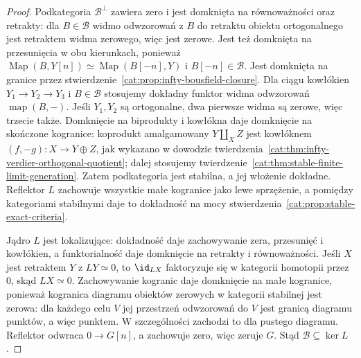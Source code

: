 \begin{proof}
Podkategoria $\mathcal B^\perp$ zawiera zero i jest domknięta na równoważności oraz retrakty: dla $B\in\mathcal B$ widmo odwzorowań z $B$ do retraktu obiektu ortogonalnego jest retraktem widma zerowego, więc jest zerowe. Jest też domknięta na przesunięcia w obu kierunkach, ponieważ $\operatorname{Map}(B,Y[n])\simeq\operatorname{Map}(B[-n],Y)$ i $B[-n]\in\mathcal B$. Jest domknięta na granice przez stwierdzenie~\ref{cat:prop:infty-bousfield-closure}. Dla ciągu kowłókien $Y_1\to Y_2\to Y_3$ i $B\in\mathcal B$ stosujemy dokładny funktor widma odwzorowań $\operatorname{map}(B,-)$. Jeśli $Y_1,Y_2$ są ortogonalne, dwa pierwsze widma są zerowe, więc trzecie także. Domknięcie na biprodukty i kowłókna daje domknięcie na skończone kogranice: koprodukt amalgamowany $Y\amalg_X Z$ jest kowłóknem $(f,-g):X\to Y\oplus Z$, jak wykazano w dowodzie twierdzenia~\ref{cat:thm:infty-verdier-orthogonal-quotient}; dalej stosujemy twierdzenie~\ref{cat:thm:stable-finite-limit-generation}. Zatem podkategoria jest stabilna, a jej włożenie dokładne. Reflektor $L$ zachowuje wszystkie małe kogranice jako lewe sprzężenie, a pomiędzy kategoriami stabilnymi daje to dokładność na mocy stwierdzenia~\ref{cat:prop:stable-exact-criteria}.

Jądro $L$ jest lokalizujące: dokładność daje zachowywanie zera, przesunięć i kowłókien, a funktorialność daje domknięcie na retrakty i równoważności. Jeśli $X$ jest retraktem $Y$ z $LY\simeq0$, to $\id_{LX}$ faktoryzuje się w kategorii homotopii przez $0$, skąd $LX\simeq0$. Zachowywanie kogranic daje domknięcie na małe kogranice, ponieważ kogranica diagramu obiektów zerowych w kategorii stabilnej jest zerowa: dla każdego celu $V$ jej przestrzeń odwzorowań do $V$ jest granicą diagramu punktów, a więc punktem. W szczególności zachodzi to dla pustego diagramu. Reflektor odwraca $0\to G[n]$, a zachowuje zero, więc zeruje $G$. Stąd $\mathcal B\subseteq\ker L$.


\end{proof}
